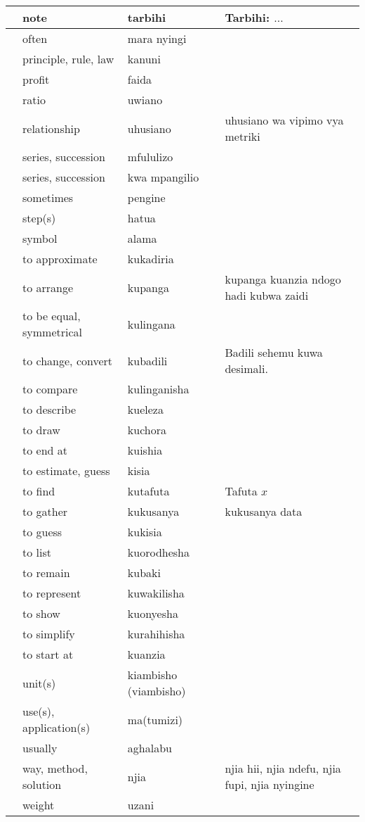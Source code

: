 \begin{center}
\begin{longtable}{|m{2cm}|m{4cm}|m{4cm}|m{4cm}|}
	&	note	&	tarbihi	&	Tarbihi: $\ldots$	\\	\hline
	&	often	&	mara nyingi	&		\\	\hline
	&	principle, rule, law	&	kanuni	&		\\	\hline
	&	profit	&	faida	&		\\	\hline
	&	ratio	&	uwiano	&		\\	\hline
	&	relationship	&	uhusiano	&	uhusiano wa vipimo vya metriki	\\	\hline
	&	series, succession	&	mfululizo	&		\\	\hline
	&	series, succession	&	kwa mpangilio	&		\\	\hline
	&	sometimes	&	pengine	&		\\	\hline
	&	step(s)	&	hatua	&		\\	\hline
	&	symbol	&	alama	&		\\	\hline
	&	to approximate	&	kukadiria	&		\\	\hline
	&	to arrange	&	kupanga	&	kupanga kuanzia ndogo hadi kubwa zaidi	\\	\hline
	&	to be equal, symmetrical	&	kulingana	&		\\	\hline
	&	to change, convert	&	kubadili	&	Badili sehemu kuwa desimali.	\\	\hline
	&	to compare	&	kulinganisha	&		\\	\hline
	&	to describe	&	kueleza	&		\\	\hline
	&	to draw	&	kuchora	&		\\	\hline
	&	to end at	&	kuishia	&		\\	\hline
	&	to estimate, guess	&	kisia	&		\\	\hline
	&	to find	&	kutafuta	&	Tafuta $x$	\\	\hline
	&	to gather	&	kukusanya	&	kukusanya data	\\	\hline
	&	to guess	&	kukisia	&		\\	\hline
	&	to list	&	kuorodhesha	&		\\	\hline
	&	to remain	&	kubaki	&		\\	\hline
	&	to represent	&	kuwakilisha	&		\\	\hline
	&	to show	&	kuonyesha	&		\\	\hline
	&	to simplify	&	kurahihisha	&		\\	\hline
	&	to start at	&	kuanzia	&		\\	\hline
	&	unit(s)	&	kiambisho (viambisho)	&		\\	\hline
	&	use(s), application(s)	&	ma(tumizi)	&		\\	\hline
	&	usually	&	aghalabu	&		\\	\hline
	&	way, method, solution	&	njia	&	njia hii, njia ndefu, njia fupi, njia nyingine	\\	\hline
	&	weight	&	uzani	&		\\	\hline

\end{longtable}
\end{center}